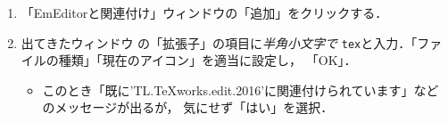 \documentclass{ltjsarticle}
\begin{document}
\begin{enumerate}
\begin{enumerate}
  \item 「EmEditorと関連付け」ウィンドウの「追加」をクリックする．

  \item 出てきたウィンドウ%
    の「拡張子」の項目に\emph{半角小文字で}
    \texttt{tex}と入力．「ファイルの種類」「現在のアイコン」を適当に設定し，
    「OK」．
    \begin{itemize}
    \item このとき「既に'TL.TeXworks.edit.2016'に関連付けられています」などのメッセージが出るが，
      気にせず「はい」を選択．
    \end{itemize}
  \end{enumerate}
\end{enumerate}
\end{document}
